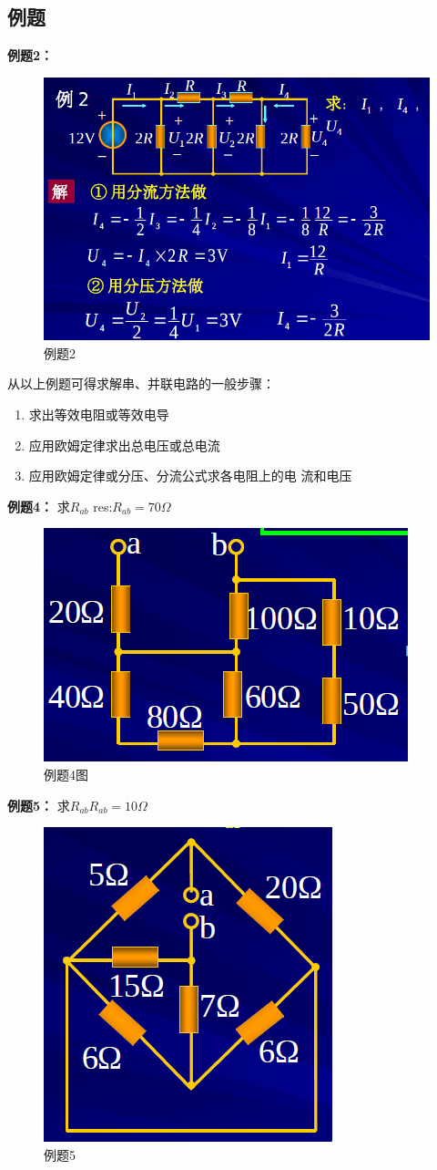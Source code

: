 \documentclass[11pt,a4paper,oneside]{book}
\begin{document}
\subsection{例题}
\noindent\textbf{例题2：}
\begin{figure}[H]
	\centering
	\includegraphics[width=0.5\linewidth]{screenshot001}
	\caption{例题2}
	\label{fig:screenshot001}
\end{figure}
从以上例题可得求解串、并联电路的一般步骤：
\begin{enumerate}
	\item 求出等效电阻或等效电导
	\item 应用欧姆定律求出总电压或总电流
	\item 应用欧姆定律或分压、分流公式求各电阻上的电
	流和电压
\end{enumerate}
\newpage
\noindent\textbf{例题4：}
求$R_{ab}$  \quad   res:$R_{ab}=70\Omega$   
\begin{figure}[H]
	\centering
	\includegraphics[width=0.4\linewidth]{screenshot002}
	\caption{例题4图}
	\label{fig:screenshot002}
\end{figure}
\noindent\textbf{例题5：}
求$R_{ab}$\quad $R_{ab}=10\Omega$
\begin{figure}[H]
	\centering
	\includegraphics[width=0.3\linewidth]{screenshot003}
	\caption{例题5}
	\label{fig:screenshot003}
\end{figure}
\end{document}
